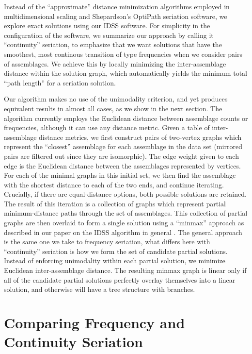 \documentclass[graybox,natbib]{svmult}
\begin{document}
Instead of the ``approximate'' distance minimization algorithms employed
in multidimensional scaling and Shepardson's OptiPath seriation
software, we explore exact solutions using our IDSS software. For
simplicity in the configuration of the software, we summarize our
approach by calling it ``continuity'' seriation, to emphasize that we
want solutions that have the smoothest, most continous transition of
type frequencies when we consider pairs of assemblages. We achieve this
by locally minimizing the inter-assemblage distance within the solution
graph, which automatically yields the minimum total ``path length'' for
a seriation solution.

Our algorithm makes no use of the unimodality criterion, and yet
produces equivalent results in almost all cases, as we show in the next
section. The algorithm currently employs the Euclidean distance between
assemblage counts or frequencies, although it can use any distance
metric. Given a table of inter-assemblage distance metrics, we first
construct pairs of two-vertex graphs which represent the ``closest''
assemblage for each assemblage in the data set (mirrored pairs are
filtered out since they are isomorphic). The edge weight given to each
edge is the Euclidean distance between the assemblages represented by
vertices. For each of the minimal graphs in this initial set, we then
find the assemblage with the shortest distance to each of the two ends,
and continue iterating. Crucially, if there are equal-distance options,
both possible solutions are retained. The result of this iteration is a
collection of graphs which represent partial minimum-distance paths
through the set of assemblages. This collection of partial graphs are
then overlaid to form a single solution using a ``minmax'' approach as
described in our paper on the IDSS algorithm in general
\citep{lipomadsendunnell2015}. The general approach is the same one we
take to frequency seriation, what differs here with ``continuity''
seriation is how we form the set of candidate partial solutions. Instead
of enforcing unimodality within each partial solution, we minimize
Euclidean inter-assemblage distance. The resulting minmax graph is
linear only if all of the candidate partial solutions perfectly overlay
themselves into a linear solution, and otherwise will have a tree
structure with branches.

\section{Comparing Frequency and Continuity
Seriation}\label{comparing-frequency-and-continuity-seriation}
\end{document}
